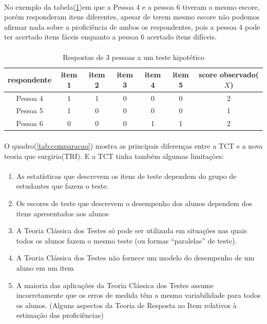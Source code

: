 	\paragraph{}
		No exemplo da tabela(\ref{tab:pessoas2})em que a Pessoa 4 e a pessoa 6 tiveram o mesmo escore, porém responderam itens diferentes, apesar de terem mesmo escore não podemos afirmar nada sobre a proficiência de ambos os respondentes, pois a pessoa 4 pode ter acertado itens fáceis enquanto a pessoa 6 acertado itens difíceis.
    \paragraph{}
	\begin{table}[!h]
	    \centering
	    \begin{tabular}{*{6}{c|}c}
	    \hline
	    respondente & item 1& item 2& item 3 & item 4 & item 5 & score observado($X$)\\
	    \hline
	    \hline
	        Pessoa 4 &  1 & 1 & 0 & 0 & 0 & 2\\
            Pessoa 5 &  1 & 0 & 0 & 0 & 0 & 1\\
            Pessoa 6 &  0 & 0 & 0 & 1 & 1 & 2 \\
            \hline
	    \end{tabular}
	    \caption{Respostas de 3 pessoas a um teste hipotético}
	    \label{tab:pessoas2}
	\end{table}
	\paragraph{}
		O quadro(\ref{tab:comparacao}) mostra as principais diferenças entre a TCT e a nova teoria que surgiria(TRI). E a TCT tinha também algumas limitações:
	\paragraph{}
    	\begin{enumerate}[noitemsep]
    	    \item As estatísticas que descrevem os itens de teste dependem do grupo de estudantes que fazem o teste.\\
            \item Os escores de teste que descrevem o desempenho dos alunos dependem dos itens apresentados aos alunos\\
            \item A Teoria Clássica dos Testes só pode ser utilizada em situações nas quais todos os alunos fazem o mesmo teste (ou formas “paralelas” de teste).\\
            \item A Teoria Clássica dos Testes não fornece um modelo do desempenho de um aluno em um item\\
            \item A maioria das aplicações da Teoria Clássica dos Testes assume incorretamente que os erros de medida têm a mesma variabilidade para todos os alunos. (Alguns aspectos da Teoria de Resposta ao Item relativos à estimação das proficiências)
	    \end{enumerate}
